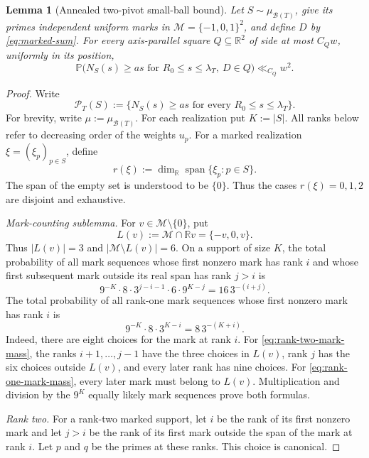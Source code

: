 \documentclass[11pt]{article}
\numberwithin{equation}{section}
\theoremstyle{plain}
\newtheorem{lemma}[theorem]{Lemma}
\newcommand{\Pp}{\mathbb P}
\newcommand{\1}{\mathbf 1}
\newcommand{\cB}{\mathcal B}
\newcommand{\cM}{\mathcal M}
\begin{document}
\begin{lemma}[Annealed two-pivot small-ball bound]
\label{lem:two-pivot}
Let $S\sim\mu_{\cB(T)}$, give its primes independent uniform marks in
$\cM=\{-1,0,1\}^2$, and define $D$ by \eqref{eq:marked-sum}.  For every
axis-parallel square $Q\subseteq\mathbb R^2$ of side at most $C_Qw$,
uniformly in its position,
\begin{equation}\label{eq:two-pivot}
 \Pp\bigl(
 N_S(s)\ge as\text{ for }R_0\le s\le\lambda_T,
 \ D\in Q
 \bigr)
 \ll_{C_Q}w^2.
\end{equation}
\end{lemma}

\begin{proof}
Write
\[
 \mathcal P_T(S):=
 \{N_S(s)\ge as\text{ for every }R_0\le s\le\lambda_T\}.
\]
For brevity, write $\mu:=\mu_{\cB(T)}$.
For each realization put $K:=|S|$.
All ranks below refer to decreasing order of the weights $u_p$.  For a
marked realization $\xi=(\xi_p)_{p\in S}$, define
\[
 r(\xi):=\dim_{\mathbb R}\operatorname{span}\{\xi_p:p\in S\}.
\]
The span of the empty set is understood to be $\{0\}$.  Thus the cases
$r(\xi)=0,1,2$ are disjoint and exhaustive.

\smallskip
\noindent\emph{Mark-counting sublemma.}
For $v\in\cM\setminus\{0\}$, put
\[
 L(v):=\cM\cap\mathbb Rv=\{-v,0,v\}.
\]
Thus $|L(v)|=3$ and $|\cM\setminus L(v)|=6$.  On a support of size $K$,
the total probability of all mark sequences whose first nonzero mark has
rank $i$ and whose first subsequent mark outside its real span has rank
$j>i$ is
\begin{equation}\label{eq:rank-two-mark-mass}
 9^{-K}\cdot8\cdot3^{j-i-1}\cdot6\cdot9^{K-j}
 =16\,3^{-(i+j)}.
\end{equation}
The total probability of all rank-one mark sequences whose first nonzero
mark has rank $i$ is
\begin{equation}\label{eq:rank-one-mark-mass}
 9^{-K}\cdot8\cdot3^{K-i}
 =8\,3^{-(K+i)}.
\end{equation}
Indeed, there are eight choices for the mark at rank $i$.  For
\eqref{eq:rank-two-mark-mass}, the ranks $i+1,\ldots,j-1$ have the three
choices in $L(v)$, rank $j$ has the six choices outside $L(v)$, and every
later rank has nine choices.  For \eqref{eq:rank-one-mark-mass}, every
later mark must belong to $L(v)$.  Multiplication and division by the
$9^K$ equally likely mark sequences prove both formulas.

\smallskip
\noindent\emph{Rank two.}
For a rank-two marked support, let $i$ be the rank of its first nonzero
mark and let $j>i$ be the rank of its first mark outside the span of the
mark at rank $i$.  Let $p$ and $q$ be the primes at these ranks.  This
choice is canonical.


\end{proof}
\end{document}
